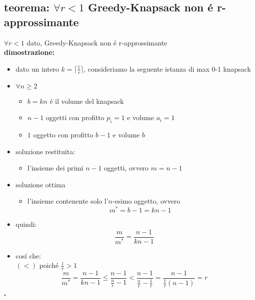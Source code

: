 
\subsection*{teorema: $\forall r<1$ Greedy-Knapsack non \'e r-approssimante}
\begin{flushleft}
	$\forall r<1$ dato, Greedy-Knapsack non \'e r-approssimante \newline \\
	\textbf{dimostrazione:}
	\begin{itemize}
		\item dato un intero $k=\lceil\frac{1}{r}\rceil$, consideriamo la seguente istanza di max 0-1 knapsack
		\item $\forall n\geq 2$
		\begin{itemize}
			\item $b=kn$ \'e il volume del knapsack
			\item $n-1$ oggetti con profitto $p_i=1$ e volume $a_i=1$
			\item $1$ oggetto con profitto $b-1$ e volume $b$
		\end{itemize}
		\item soluzione restituita:
		\begin{itemize}
			\item l'insieme dei primi $n-1$ oggetti, ovvero $m=n-1$
		\end{itemize}
		\item soluzione ottima
		\begin{itemize}
			\item l'insieme contenente solo l'$n$-esimo oggetto, ovvero $$m^*=b-1=kn-1$$
		\end{itemize}
		\vspace{0.5cm}
		\item quindi: $$\frac{m}{m^*}=\frac{n-1}{kn-1}$$
		\item cos\'i che: \newline \\
			\hspace{8cm}$(<)$ poich\'e $\frac{1}{r}>1$
			$$\frac{m}{m^*}=\frac{n-1}{kn-1}\leq\frac{n-1}{\frac{n}{r}-1}<\frac{n-1}{\frac{n}{r}-\frac{1}{r}}=\frac{n-1}{\frac{1}{r}(n-1)}=r$$
	\end{itemize}
	\hfill$\square$
\end{flushleft}

